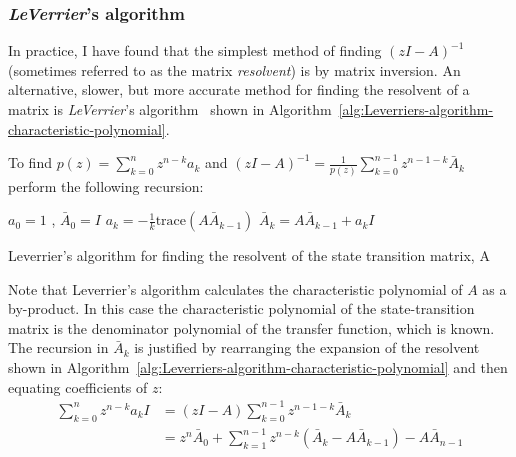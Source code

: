 \documentclass[a4paper,twoside,10pt,english]{report}
\begin{document}
\subsubsection{\emph{LeVerrier}'s algorithm}
In practice, I have found that the simplest method of finding $(zI-A)^{-1}$ 
(sometimes referred to as the matrix \emph{resolvent}) is by
matrix inversion. An alternative, slower, but more accurate method for finding
the resolvent of a matrix is \emph{LeVerrier}'s algorithm~\cite[Algorithm
8A.12]{RobertsMullis_DigitalSignalProcessing} shown in
Algorithm~\ref{alg:Leverriers-algorithm-characteristic-polynomial}.
\begin{algorithm}[!pbth]
To find $p\left(z\right)=\sum_{k=0}^{n}z^{n-k}a_{k}$ and
$\left(zI-A\right)^{-1}=\frac{1}{p\left(z\right)}\sum_{k=0}^{n-1}z^{n-1-k}\bar{A}_{k}$
perform the following recursion:
\begin{algorithmic}
\State $a_{0}=1$ , $\bar{A}_{0}=I$
  \State $a_{k}= -\frac{1}{k}\text{trace}\left(A\bar{A}_{k-1}\right)$
  \vspace{1.5mm}
  \State $\bar{A}_{k}=A\bar{A}_{k-1}+a_{k}I$
\EndFor
\end{algorithmic}
\caption{Leverrier's algorithm for finding the resolvent of the state transition matrix, A~\cite[Algorithm 8A.12]{RobertsMullis_DigitalSignalProcessing}}
\label{alg:Leverriers-algorithm-characteristic-polynomial}
\end{algorithm}
Note that Leverrier's algorithm calculates the characteristic polynomial of $A$
as a by-product. In this case the characteristic polynomial of the 
state-transition matrix is the denominator polynomial of the transfer function, 
which is known. The recursion in $\bar{A}_{k}$ is justified by rearranging
the expansion of the resolvent shown in 
Algorithm~\ref{alg:Leverriers-algorithm-characteristic-polynomial} and then 
equating coefficients of $z$:
\begin{align*}
\sum_{k=0}^{n}z^{n-k}a_{k}I&=\left(zI-A\right)\sum_{k=0}^{n-1}z^{n-1-k}\bar{A}_{k}\\
&=z^{n}\bar{A}_{0}
+\sum_{k=1}^{n-1}z^{n-k}\left(\bar{A}_{k}-A\bar{A}_{k-1}\right) 
-A\bar{A}_{n-1}
\end{align*}
\end{document}
